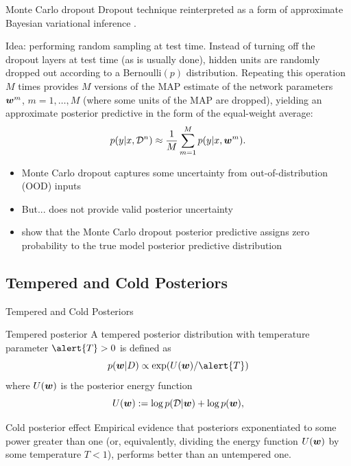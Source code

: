 \documentclass[9pt,handout]{beamer}
\begin{document}
\begin{frame}{Monte Carlo dropout}
\alert{Dropout} technique reinterpreted as a form of approximate Bayesian variational inference \citep{kingma2015variational,gal2016dropout}.

\alert{Idea}: performing random sampling at test time. Instead of turning off the dropout layers at test time (as is usually done), \alert{hidden units} are randomly dropped out according to a \alert{Bernoulli$(p)$} distribution. Repeating this operation $M$ times provides $M$ versions of the MAP estimate of the network parameters $\boldsymbol{w}^m$, $m=1,\ldots,M$ (where some units of the MAP are dropped), yielding an approximate posterior predictive in the form of the equal-weight average:
\begin{equation*}
	p(y\vert x, \mathcal{D}^n)\approx \frac{1}{M}\sum_{m=1}^M p(y\vert x, \boldsymbol{w}^m).
\end{equation*}

\vfill 

\begin{itemize}[<+->]
	\item Monte Carlo dropout captures some uncertainty from out-of-distribution (OOD) inputs
	\item But... \alert{does not provide valid posterior uncertainty}
	\item \citet{folgoc2021mc} show that the Monte Carlo dropout posterior predictive assigns \alert{zero probability} to the true model posterior predictive distribution
\end{itemize}
\end{frame}

\subsection{Tempered and Cold Posteriors}

\begin{frame}{Tempered and Cold Posteriors}
\begin{block}{Tempered posterior}
	A \alert{tempered posterior distribution} with \alert{temperature parameter} $\alert{T}>0$ is defined as $$p(\bw|D) \propto \exp(U (\bw)/\alert{T} )$$ where $U(\boldsymbol{w})$ is the posterior energy function
\begin{equation*}
 U(\boldsymbol{w}) :=  \log p(\mathcal{D} | \boldsymbol{w}) + \log p(\boldsymbol{w}),
\end{equation*}
\end{block}

\pause

\begin{block}{Cold posterior effect}
Empirical evidence \citep{wenzel2020good} that posteriors  exponentiated to some power greater than one (or, equivalently, dividing the energy function $U(\boldsymbol{w})$ by some temperature $T<1$), \alert{performs better} than an untempered one.
\end{block}
\end{frame}
	
\end{document}
